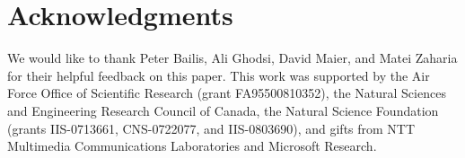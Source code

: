 \section*{Acknowledgments}
We would like to thank Peter Bailis, Ali Ghodsi, David Maier, and Matei Zaharia
for their helpful feedback on this paper.  This work was supported by the Air
Force Office of Scientific Research (grant FA95500810352), the Natural Sciences
and Engineering Research Council of Canada, the Natural Science Foundation
(grants IIS-0713661, CNS-0722077, and IIS-0803690), and gifts from NTT
Multimedia Communications Laboratories and Microsoft Research.
